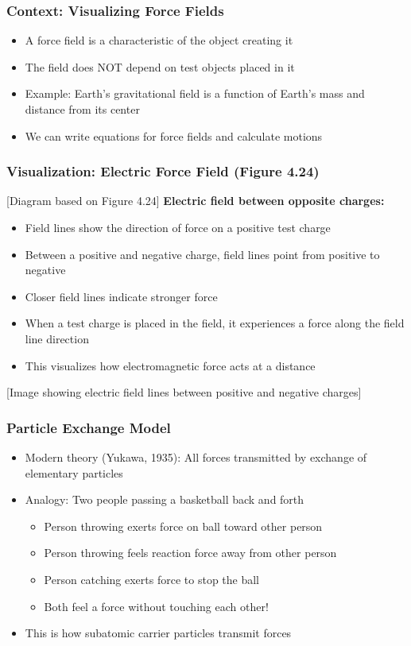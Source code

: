 \documentclass{beamer}
\begin{document}
\begin{frame}
\frametitle{Context: Visualizing Force Fields}
\begin{itemize}
    \item A force field is a characteristic of the object creating it \pause
    \item The field does NOT depend on test objects placed in it \pause
    \item Example: Earth's gravitational field is a function of Earth's mass and distance from its center \pause
    \item We can write equations for force fields and calculate motions
\end{itemize}
\end{frame}

\begin{frame}
\frametitle{Visualization: Electric Force Field (Figure 4.24)}
\begin{alertblock}{[Diagram based on Figure 4.24]}
\textbf{Electric field between opposite charges:}
\begin{itemize}
    \item Field lines show the direction of force on a positive test charge
    \item Between a positive and negative charge, field lines point from positive to negative
    \item Closer field lines indicate stronger force
    \item When a test charge is placed in the field, it experiences a force along the field line direction
    \item This visualizes how electromagnetic force acts at a distance
\end{itemize}
\alert{[Image showing electric field lines between positive and negative charges]}
\end{alertblock}
\end{frame}

\begin{frame}
\frametitle{Particle Exchange Model}
\begin{itemize}
    \item Modern theory (Yukawa, 1935): All forces transmitted by exchange of elementary particles \pause
    \item Analogy: Two people passing a basketball back and forth \pause
    \begin{itemize}
        \item Person throwing exerts force on ball toward other person
        \item Person throwing feels reaction force away from other person
        \item Person catching exerts force to stop the ball
        \item Both feel a force without touching each other!
    \end{itemize} \pause
    \item This is how subatomic carrier particles transmit forces
\end{itemize}
\end{frame}
\end{document}
